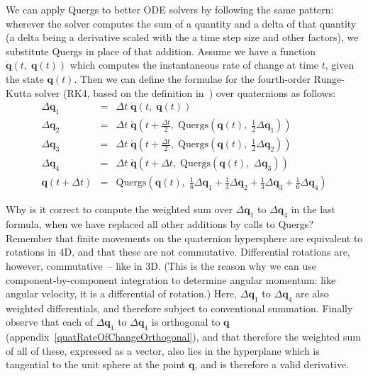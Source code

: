 We can apply Quergs to better ODE solvers by following the same pattern: wherever the solver
computes the sum of a quantity and a delta of that quantity (a delta being a derivative
scaled with the a time step size and other factors), we substitute Quergs in place of that
addition. Assume we have a function $\dot{\mathbf{q}}(t,\; \mathbf{q}(t))$ which computes the
instantaneous rate of change at time $t$, given the state $\mathbf{q}(t)$. Then we can define
the formulae for the fourth-order Runge-Kutta solver (RK4, based on the definition
in~\cite{NRinC}) over quaternions as follows:
\begin{eqnarray*}
\Delta\mathbf{q}_1 & = & \Delta t\;\dot{\mathbf{q}}\left(t,\;\mathbf{q}(t)\right) \\
\Delta\mathbf{q}_2 & = & \Delta t\;\dot{\mathbf{q}}\left(t + \frac{\Delta t}{2},\;
    \mathrm{Quergs}\left(\mathbf{q}(t),\; \frac{1}{2}\Delta\mathbf{q}_1\right)\right) \\
\Delta\mathbf{q}_3 & = & \Delta t\;\dot{\mathbf{q}}\left(t + \frac{\Delta t}{2},\;
    \mathrm{Quergs}\left(\mathbf{q}(t),\; \frac{1}{2}\Delta\mathbf{q}_2\right)\right) \\
\Delta\mathbf{q}_4 & = & \Delta t\;\dot{\mathbf{q}}\left(t + \Delta t,\;
    \mathrm{Quergs}\left(\mathbf{q}(t),\; \Delta\mathbf{q}_3\right)\right) \\
\mathbf{q}(t + \Delta t) & = & \mathrm{Quergs}\left(\mathbf{q}(t),\;
    \frac{1}{6}\Delta\mathbf{q}_1 + \frac{1}{3}\Delta\mathbf{q}_2 +
    \frac{1}{3}\Delta\mathbf{q}_3 + \frac{1}{6}\Delta\mathbf{q}_4\right)
\end{eqnarray*}

Why is it correct to compute the weighted sum over $\Delta\mathbf{q}_1$ to
$\Delta\mathbf{q}_4$ in the last formula, when we have replaced all other additions
by calls to Quergs? Remember that finite movements on the quaternion hypersphere are
equivalent to rotations in 4D, and that these are not commutative. Differential
rotations are, however, commutative~-- like in 3D. (This is the reason why we can
use component-by-component integration to determine angular momentum:
like angular velocity, it is a differential of rotation.) Here, $\Delta\mathbf{q}_1$ to
$\Delta\mathbf{q}_4$ are also weighted differentials, and therefore subject to
conventional summation. Finally observe that each of $\Delta\mathbf{q}_1$ to
$\Delta\mathbf{q}_4$ is orthogonal to $\mathbf{q}$ (appendix~\ref{quatRateOfChangeOrthogonal}),
and that therefore the weighted sum of all of these, expressed as a vector, also
lies in the hyperplane which is tangential to the unit sphere at the point $\mathbf{q}$,
and is therefore a valid derivative.
